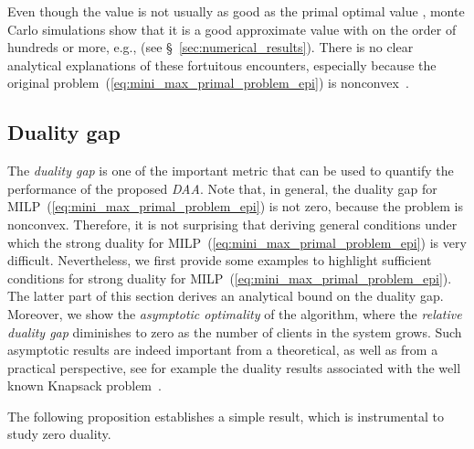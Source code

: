 \documentclass[journal, 10pt, twocolumn]{IEEEtran}
\begin{document}
Even though the value  is not usually as good as the primal optimal value , monte Carlo simulations show that it is a good approximate value with  on the order of hundreds or more, e.g.,  (see \S~\ref{sec:numerical_results}). There is no clear analytical explanations of these fortuitous encounters, especially because the original problem~(\ref{eq:mini_max_primal_problem_epi}) is nonconvex~\cite[\S~6.3]{Bertsekas-99}.

\vspace{-3mm}
\subsection{Duality gap}\label{subsec:duality_gap}
The \emph{duality gap}  is one of the important metric that can be used to quantify the performance of the proposed \emph{DAA}. Note that, in general, the duality gap for MILP~(\ref{eq:mini_max_primal_problem_epi}) is not zero, because the problem is nonconvex. Therefore, it is not surprising that deriving general conditions under which the strong duality for MILP~(\ref{eq:mini_max_primal_problem_epi}) is very difficult. Nevertheless, we first provide some examples to highlight sufficient conditions for strong duality for MILP~(\ref{eq:mini_max_primal_problem_epi}). The latter part of this section derives an analytical bound on the duality gap. Moreover, we show the \emph{asymptotic optimality} of the algorithm, where the \emph{relative duality gap}  diminishes to zero as the number of clients in the system grows. Such asymptotic results are indeed important from a theoretical, as well as from a practical perspective, see for example the duality results associated with the well known Knapsack problem~\cite{Bertsekas-99}.

The following proposition establishes a simple result, which is instrumental to study zero duality.
\end{document}
